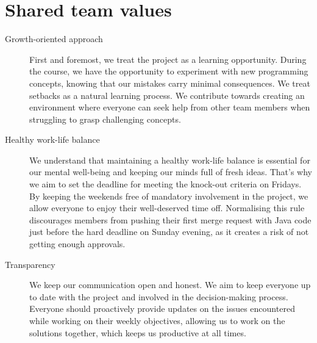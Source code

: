 \section{Shared team values}

\begin{description}
\item [Growth-oriented approach] First and foremost, we treat the project as a learning opportunity.
During the course, we have the opportunity to experiment with new programming concepts, knowing that our mistakes carry minimal consequences.
We treat setbacks as a natural learning process.
We contribute towards creating an environment where everyone can seek help from other team members when struggling to grasp challenging concepts.
\item [Healthy work-life balance] We understand that maintaining a healthy work-life balance is essential for our mental well-being and keeping our minds full of fresh ideas.
That's why we aim to set the deadline for meeting the knock-out criteria on Fridays.
By keeping the weekends free of mandatory involvement in the project, we allow everyone to enjoy their well-deserved time off.
Normalising this rule discourages members from pushing their first merge request with Java code just before the hard deadline on Sunday evening, as it creates a risk of not getting enough approvals.
\item [Transparency] We keep our communication open and honest.
We aim to keep everyone up to date with the project and involved in the decision-making process.
Everyone should proactively provide updates on the issues encountered while working on their weekly objectives, allowing us to work on the solutions together, which keeps us productive at all times.
\end{description}


